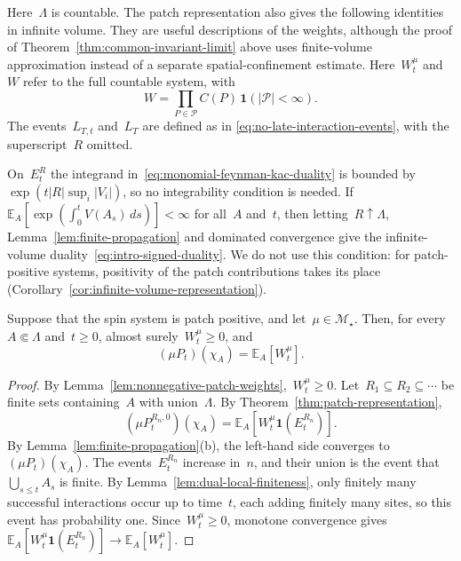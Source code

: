 \documentclass[EJP,preprint,NODS,nobera]{ejpecp}
\newcommand{\E}{\mathbb{E}}
\newcommand{\bb}[1]{\left(#1\right)}
\newcommand{\Cb}[1]{\left[#1\right]}
\newcommand{\abs}[1]{\left|#1\right|}
\newcommand{\ind}{\mathbf{1}}
\begin{document}
{\color{red}
Here~$\Lambda$ is countable. The patch representation also gives the following identities in infinite volume. They are useful descriptions of the weights, although the proof of Theorem~\ref{thm:common-invariant-limit} above uses finite-volume approximation instead of a separate spatial-confinement estimate. Here~$W_t^\mu$ and~$W$ refer to the full countable system, with
\begin{equation}
\label{eq:limiting-patch-weight}
W=\prod_{P\in\mathcal P}C(P)\,\ind\bb{\abs{\mathcal P}<\infty}.
\end{equation}
The events~$L_{T,t}$ and~$L_T$ are defined as in
\eqref{eq:no-late-interaction-events}, with the superscript~$R$ omitted.
}

\begin{remark}
\label{rem:fk-infinite-volume}
On~$E_t^R$ the integrand in~\eqref{eq:monomial-feynman-kac-duality} is bounded
by~$\exp\bb{t\abs R\sup_i\abs{V_i}}$, so no integrability condition is needed.
If~$\E_A\Cb{\exp\bb{\int_0^tV(A_s)\,ds}}<\infty$ for all~$A$ and~$t$, then
letting~$R\uparrow\Lambda$, Lemma~\ref{lem:finite-propagation} and dominated
convergence give the infinite-volume duality~\eqref{eq:intro-signed-duality}.
We do not use this condition: for patch-positive systems, positivity of the
patch contributions takes its place
(Corollary~\ref{cor:infinite-volume-representation}).
\end{remark}

\begin{corollary}
\label{cor:infinite-volume-representation}
Suppose that the spin system is patch positive, and let~$\mu\in\mathcal M_\star$.
Then, for every~$A\Subset\Lambda$ and~$t\geq0$, almost surely~$W_t^\mu\geq0$, and
\begin{equation}
\label{eq:infinite-volume-representation}
(\mu P_t)(\chi_A)
=
\E_A\Cb{W_t^\mu}.
\end{equation}
\end{corollary}

\begin{proof}
{\color{red}
By Lemma~\ref{lem:nonnegative-patch-weights},~$W_t^\mu\geq0$.
}
Let~$R_1\subseteq R_2\subseteq\cdots$ be finite sets containing~$A$ with union~$\Lambda$.
By Theorem~\ref{thm:patch-representation},
\begin{equation*}
(\mu P_t^{R_n,0})(\chi_A)
=
\E_A\Cb{W_t^\mu\ind\bb{E_t^{R_n}}}.
\end{equation*}
By Lemma~\ref{lem:finite-propagation}(b), the left-hand side converges
to~$(\mu P_t)(\chi_A)$. The events~$E_t^{R_n}$ increase in~$n$, and their union
is the event that~$\bigcup_{s\leq t}A_s$ is finite. By
Lemma~\ref{lem:dual-local-finiteness}, only finitely many successful
interactions occur up to time~$t$, each adding finitely many sites, so this
event has probability one. Since~$W_t^\mu\geq0$, monotone convergence gives
$\E_A\Cb{W_t^\mu\ind\bb{E_t^{R_n}}}\to\E_A\Cb{W_t^\mu}$.
\end{proof}
\end{document}
